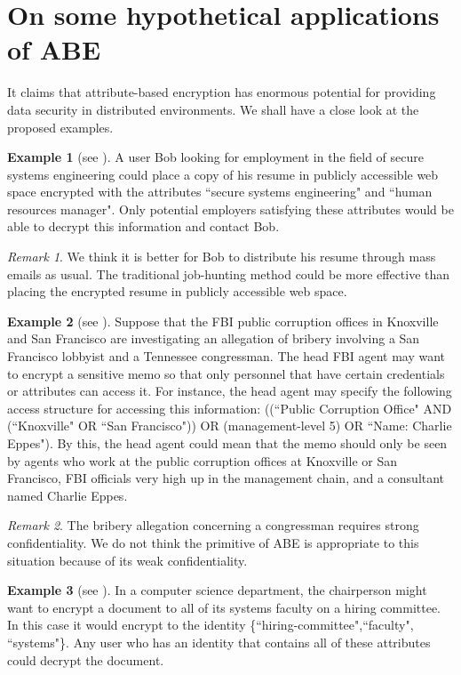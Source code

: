 \documentclass[11pt]{article}
\begin{document}
 \section{On some hypothetical applications of ABE}
It claims that
attribute-based encryption has enormous potential for providing
data security in distributed environments. We shall have a close look at the proposed examples.

\textbf{Example 1} (see \cite{PTMW06}).  A user Bob looking for
employment in the field of secure systems engineering could
place a copy of his resume in publicly accessible web space
encrypted with the attributes ``secure systems engineering"
and ``human resources manager". Only potential employers
satisfying these attributes would be able to decrypt this
information and contact Bob.

\emph{Remark 1}. We think it is better for Bob to distribute his resume through mass emails as usual.
The traditional job-hunting method could be more effective than placing the encrypted resume in publicly accessible web space.

\textbf{Example 2} (see \cite{BSW07}). Suppose that the FBI public corruption offices
in Knoxville and San Francisco are investigating
an allegation of bribery involving a San Francisco lobbyist
and a Tennessee congressman. The head FBI
agent may want to encrypt a sensitive memo so that
only personnel that have certain credentials or attributes can access it. For instance, the head agent
may specify the following access structure for accessing
this information: ((``Public Corruption Office"
AND (``Knoxville" OR ``San Francisco")) OR
(management-level  5) OR ``Name: Charlie
Eppes").  By this, the head agent could mean that the memo
should only be seen by agents who work at the public
corruption offices at Knoxville or San Francisco, FBI
officials very high up in the management chain, and a
consultant named Charlie Eppes.

\emph{Remark 2}. The bribery allegation concerning a congressman requires strong confidentiality. We do not think the primitive of ABE is appropriate to this situation because of its weak confidentiality.

\textbf{Example 3} (see \cite{SW05}).  In a computer science department, the chairperson might want to encrypt
a document to all of its systems faculty on a hiring committee. In this case it would encrypt to the
identity \{``hiring-committee",``faculty", ``systems"\}. Any user who has an identity that contains all
of these attributes could decrypt the document.
\end{document}
